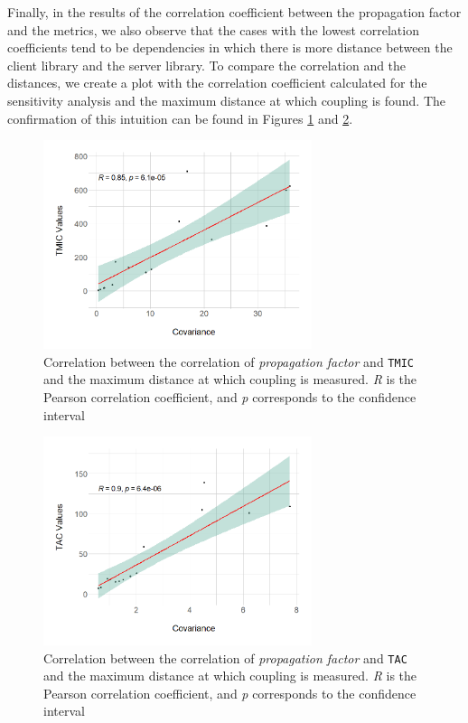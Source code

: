 Finally, in the results of the correlation coefficient between the propagation factor and the metrics, we also observe that the cases with the lowest correlation coefficients tend to be dependencies in which there is more distance between the client library and the server library. To compare the correlation and the distances, we create a plot with the correlation coefficient calculated for the sensitivity analysis and the maximum distance at which coupling is found. The confirmation of this intuition can be found in Figures \ref{fig:cor-dist-tmic} and \ref{fig:cor-dist-tac}.

\begin{figure}[ht!]
\begin{center}
\includegraphics[width=0.7\textwidth]{figures/results/covariance-values-tmic.png}
\caption{Correlation between the correlation of \textit{propagation factor} and \texttt{TMIC} and the maximum distance at which coupling is measured. \textit{R} is the Pearson correlation coefficient, and \textit{p} corresponds to the confidence interval}
\label{fig:cor-dist-tmic}
\end{center}
\end{figure}

\begin{figure}[ht!]
\begin{center}
\includegraphics[width=0.7\textwidth]{figures/results/covariance-values-tac.png}
\caption{Correlation between the correlation of \textit{propagation factor} and \texttt{TAC} and the maximum distance at which coupling is measured. \textit{R} is the Pearson correlation coefficient, and \textit{p} corresponds to the confidence interval}
\label{fig:cor-dist-tac}
\end{center}
\end{figure}

